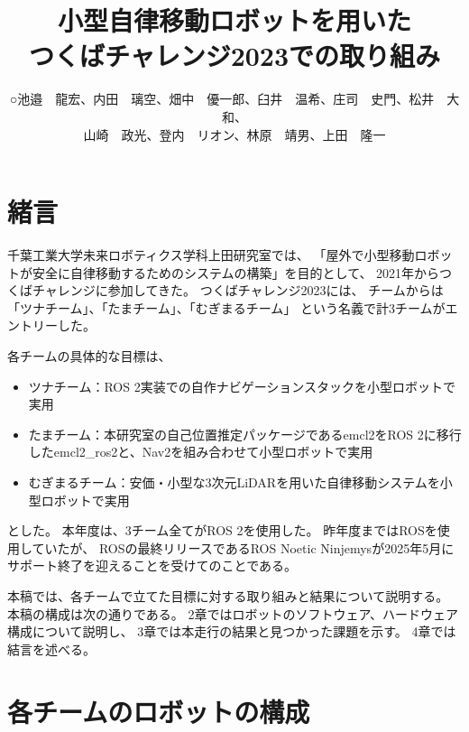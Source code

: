 \documentclass[twocolumn,9pt]{jsproceedings}
\title{小型自律移動ロボットを用いた\\つくばチャレンジ2023での取り組み}
\author{○池邉　龍宏\authorrefmark{2}、内田　璃空\authorrefmark{2}、畑中　優一郎\authorrefmark{1}、臼井　温希\authorrefmark{1}、庄司　史門\authorrefmark{1}、松井　大和\authorrefmark{1}、\\
山崎　政光\authorrefmark{1}、登内　リオン\authorrefmark{1}、林原　靖男\authorrefmark{1}、上田　隆一\authorrefmark{1}}
\affiliation{千葉工業大学 未来ロボティクス学科 ツナチーム/たまチーム/むぎまるチーム}
\begin{document}
\maketitle


\section{緒言}

千葉工業大学未来ロボティクス学科上田研究室では、
「屋外で小型移動ロボットが安全に自律移動するためのシステムの構築」を目的として、
2021年からつくばチャレンジに参加してきた。
つくばチャレンジ2023には、
チームからは「ツナチーム」、「たまチーム」、「むぎまるチーム」
という名義で計3チームがエントリーした。




各チームの具体的な目標は、
\begin{itemize}
  \item ツナチーム：ROS 2実装での自作ナビゲーションスタックを小型ロボットで実用
  \item たまチーム：本研究室の自己位置推定パッケージであるemcl2\cite{emcl2}をROS 2に移行したemcl2\_ros2\cite{emcl2_ros2}と、Nav2を組み合わせて小型ロボットで実用
  \item むぎまるチーム：安価・小型な3次元LiDARを用いた自律移動システムを小型ロボットで実用
\end{itemize}
とした。
本年度は、3チーム全てがROS 2\cite{ROS 2}を使用した。
昨年度まではROS\cite{ROS}を使用していたが、
ROSの最終リリースであるROS Noetic Ninjemysが2025年5月に
サポート終了を迎えることを受けてのことである。


本稿では、各チームで立てた目標に対する取り組みと結果について説明する。
本稿の構成は次の通りである。
2章ではロボットのソフトウェア、ハードウェア構成について説明し、
3章では本走行の結果と見つかった課題を示す。
4章では結言を述べる。

\section{各チームのロボットの構成}
\end{document}
